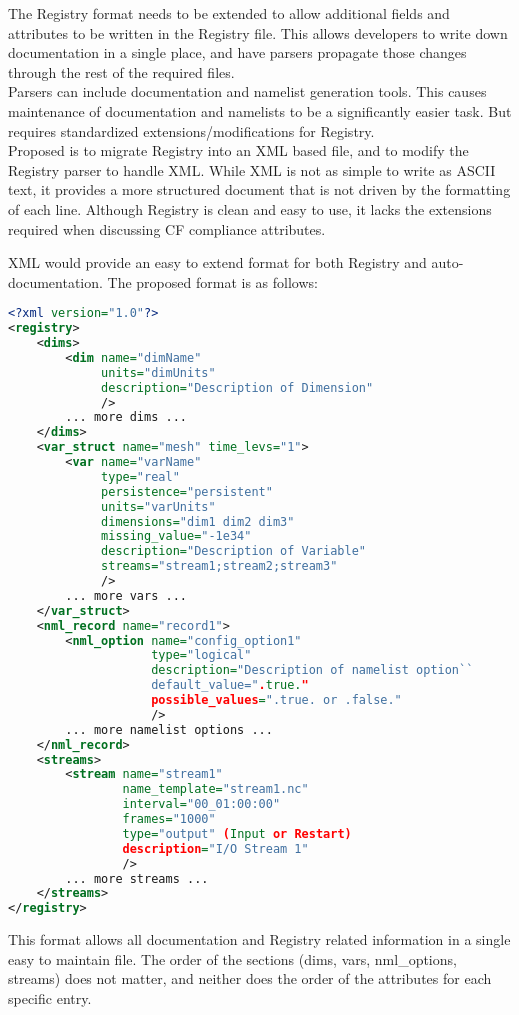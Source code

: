 \documentclass[11pt]{report}
\begin{document}
The Registry format needs to be extended to allow additional fields and
attributes to be written in the Registry file. This allows developers to write
down documentation in a single place, and have parsers propagate those changes
through the rest of the required files. \\

Parsers can include documentation and namelist generation tools. This causes
maintenance of documentation and namelists to be a significantly easier task.
But requires standardized extensions/modifications for Registry. \\


Proposed is to migrate Registry into an XML based file, and to modify the
Registry parser to handle XML. While XML is not as simple to write as ASCII
text, it provides a more structured document that is not driven by the
formatting of each line. Although Registry is clean and easy to use, it lacks
the extensions required when discussing CF compliance attributes.

XML would provide an easy to extend format for both Registry and auto-documentation. The proposed format is as follows:

{\small
\begin{lstlisting}[language=XML]
<?xml version="1.0"?>
<registry>
	<dims>
		<dim name="dimName"
			 units="dimUnits"
			 description="Description of Dimension"
			 />
		... more dims ...
	</dims>
	<var_struct name="mesh" time_levs="1">
		<var name="varName"
			 type="real"
			 persistence="persistent"
			 units="varUnits"
			 dimensions="dim1 dim2 dim3"
			 missing_value="-1e34"
			 description="Description of Variable"
			 streams="stream1;stream2;stream3"
			 />
		... more vars ...
	</var_struct>
	<nml_record name="record1">
		<nml_option name="config_option1"
					type="logical"
					description="Description of namelist option``
					default_value=".true."
					possible_values=".true. or .false."
					/>
		... more namelist options ...
	</nml_record>
	<streams>
		<stream name="stream1"
				name_template="stream1.nc"
				interval="00_01:00:00"
				frames="1000"
				type="output" (Input or Restart)
				description="I/O Stream 1"
				/>
		... more streams ...
	</streams>
</registry>
\end{lstlisting}
}

This format allows all documentation and Registry related information in a
single easy to maintain file. The order of the sections (dims, vars,
nml\_options, streams) does not matter, and neither does the order of the
attributes for each specific entry. \\
\end{document}
